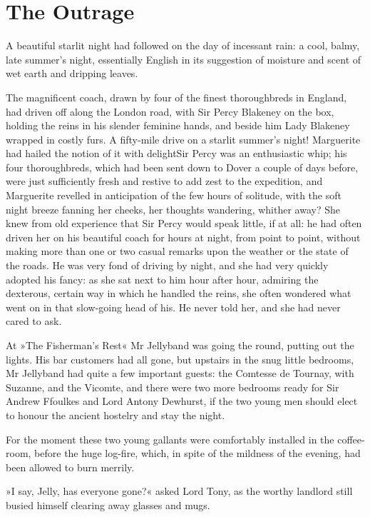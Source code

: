 
\chapter{The Outrage}
\lettrine[lines=4]{A}{} beautiful starlit night had followed on the day of incessant rain: a cool, balmy, late summer's night, essentially English in its suggestion of moisture and scent of wet earth and dripping leaves.

The magnificent coach, drawn by four of the finest thoroughbreds in England, had driven off along the London road, with Sir Percy Blakeney on the box, holding the reins in his slender feminine hands, and beside him Lady Blakeney wrapped in costly furs. A fifty-mile drive on a starlit summer's night! Marguerite had hailed the notion of it with delight\textellipsis \allowbreak  Sir Percy was an enthusiastic whip; his four thoroughbreds, which had been sent down to Dover a couple of days before, were just sufficiently fresh and restive to add zest to the expedition, and Marguerite revelled in anticipation of the few hours of solitude, with the soft night breeze fanning her cheeks, her thoughts wandering, whither away? She knew from old experience that Sir Percy would speak little, if at all: he had often driven her on his beautiful coach for hours at night, from point to point, without making more than one or two casual remarks upon the weather or the state of the roads. He was very fond of driving by night, and she had very quickly adopted his fancy: as she sat next to him hour after hour, admiring the dexterous, certain way in which he handled the reins, she often wondered what went on in that slow-going head of his. He never told her, and she had never cared to ask.

At »The Fisherman's Rest« Mr Jellyband was going the round, putting out the lights. His bar customers had all gone, but upstairs in the snug little bedrooms, Mr Jellyband had quite a few important guests: the Comtesse de Tournay, with Suzanne, and the Vicomte, and there were two more bedrooms ready for Sir Andrew Ffoulkes and Lord Antony Dewhurst, if the two young men should elect to honour the ancient hostelry and stay the night.

For the moment these two young gallants were comfortably installed in the coffee-room, before the huge log-fire, which, in spite of the mildness of the evening, had been allowed to burn merrily.

»I say, Jelly, has everyone gone?« asked Lord Tony, as the worthy landlord still busied himself clearing away glasses and mugs.

